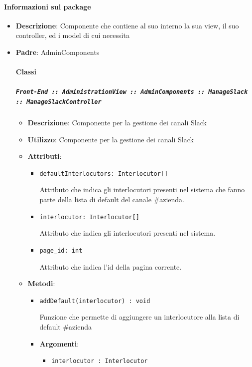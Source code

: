 \documentclass[../DefinizioneDiProdotto.tex]{subfiles}
\begin{document}
	\paragraph{Informazioni sul package}\begin{itemize}\item \textbf{Descrizione}: Componente che contiene al suo interno la sua view, il suo controller, ed i model di cui necessita\item \textbf{Padre}: AdminComponents\paragraph{Classi}
	\subparagraph{\texttt{Front-End :: AdministrationView :: AdminComponents :: ManageSlack :: ManageSlackController}}
	\begin{itemize}\item \textbf{Descrizione}: Componente per la gestione dei canali Slack
	\item \textbf{Utilizzo}: Componente per la gestione dei canali Slack
	\item \textbf{Attributi}:
	\begin{itemize}
	\item \texttt{defaultInterlocutors: Interlocutor[]}\

	 Attributo che indica gli interlocutori presenti nel sistema che fanno parte della lista di default del canale \#azienda.
	\end{itemize}
	\begin{itemize}
	\item \texttt{interlocutor: Interlocutor[]}\

	 Attributo che indica gli interlocutori presenti nel sistema.
	\end{itemize}
	\begin{itemize}
	\item \texttt{page\_id: int}\

	 Attributo che indica l'id della pagina corrente.
	\end{itemize}
	\item \textbf{Metodi}:
	\begin{itemize}
	\item \texttt{addDefault(interlocutor) : void}\

	 Funzione che permette di aggiungere un interlocutore alla lista di default \#azienda

	\item \textbf{Argomenti}:
	\begin{itemize}
	\item \texttt{interlocutor : Interlocutor}\


\end{itemize}
\end{itemize}
\end{itemize}
\end{itemize}
\end{document}
